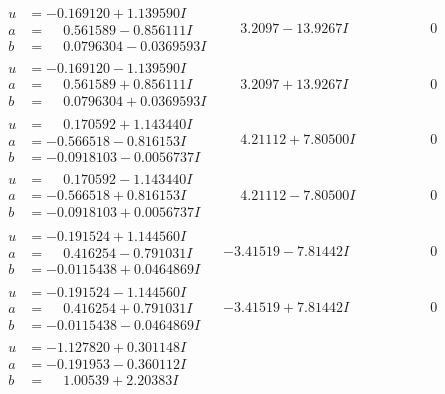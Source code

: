 \documentclass[1p]{elsarticle_modified}
\theoremstyle{definition}
\begin{document}
$$\begin{array}{c|c|c}
\begin{aligned}
u &= -0.169120 + 1.139590 I \\
a &= \phantom{-}0.561589 - 0.856111 I \\
b &= \phantom{-}0.0796304 - 0.0369593 I\end{aligned}
 & \phantom{-}3.2097 - 13.9267 I & \phantom{-0.000000 } 0 \\ \hline\begin{aligned}
u &= -0.169120 - 1.139590 I \\
a &= \phantom{-}0.561589 + 0.856111 I \\
b &= \phantom{-}0.0796304 + 0.0369593 I\end{aligned}
 & \phantom{-}3.2097 + 13.9267 I & \phantom{-0.000000 } 0 \\ \hline\begin{aligned}
u &= \phantom{-}0.170592 + 1.143440 I \\
a &= -0.566518 - 0.816153 I \\
b &= -0.0918103 - 0.0056737 I\end{aligned}
 & \phantom{-}4.21112 + 7.80500 I & \phantom{-0.000000 } 0 \\ \hline\begin{aligned}
u &= \phantom{-}0.170592 - 1.143440 I \\
a &= -0.566518 + 0.816153 I \\
b &= -0.0918103 + 0.0056737 I\end{aligned}
 & \phantom{-}4.21112 - 7.80500 I & \phantom{-0.000000 } 0 \\ \hline\begin{aligned}
u &= -0.191524 + 1.144560 I \\
a &= \phantom{-}0.416254 - 0.791031 I \\
b &= -0.0115438 + 0.0464869 I\end{aligned}
 & -3.41519 - 7.81442 I & \phantom{-0.000000 } 0 \\ \hline\begin{aligned}
u &= -0.191524 - 1.144560 I \\
a &= \phantom{-}0.416254 + 0.791031 I \\
b &= -0.0115438 - 0.0464869 I\end{aligned}
 & -3.41519 + 7.81442 I & \phantom{-0.000000 } 0 \\ \hline\begin{aligned}
u &= -1.127820 + 0.301148 I \\
a &= -0.191953 - 0.360112 I \\
b &= \phantom{-}1.00539 + 2.20383 I\end{aligned}

\end{array}$$
\end{document}
